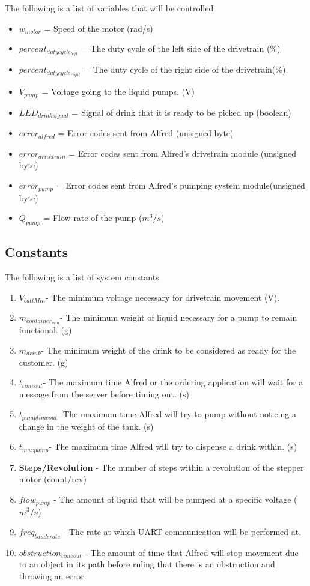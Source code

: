 \documentclass [10pt]{article}
\begin{document}
The following is a list of variables that will be controlled
\begin{itemize}
	\item $w_{motor}$ = Speed of the motor (rad/s)
	\item $percent_{dutycycle_{left}}$ = The duty cycle of the left side of the drivetrain (\%)
	\item $percent_{dutycycle_{right}}$ = The duty cycle of the right side of the drivetrain(\%)
	\item $V_{pump}$ = Voltage going to the liquid pumps. (V)
	\item $LED_{drinksignal}$ = Signal of drink that it is ready to be picked up (boolean)
	\item $error_{alfred}$ = Error codes sent from Alfred (unsigned byte)
	\item $error_{drivetrain}$ = Error codes sent from Alfred’s drivetrain module (unsigned byte)
	\item $error_{pump}$ = Error codes sent from Alfred’s pumping system module(unsigned byte)
	\item $Q_{pump}$ = Flow rate of the pump ($m^3/s$)
\end{itemize}

\subsection{Constants}

The following is a list of system constants
\begin{enumerate}
	\item \textbf{$ V_{battMin} $}- The minimum voltage necessary for drivetrain movement (V).
	\item \textbf{$ m_{container_{min}} $}- The minimum weight of liquid necessary for a pump to remain functional. (g)
	\item \textbf{$ m_{drink} $}- The minimum weight of the drink to be considered as ready for the customer. (g)
	\item \textbf{$ t_{timeout} $}- The maximum time Alfred or the ordering application will wait for a message from the server before timing out. (s)
	\item \textbf{$ t_{pumptimeout} $}- The maximum time Alfred will try to pump without noticing a change in the weight of the tank. (s)
	\item \textbf{$ t_{maxpump} $}- The maximum time Alfred will try to dispense a drink within. (s)
	\item \textbf{Steps/Revolution} -  The number of steps within a revolution of the stepper motor (count/rev)
	\item \textbf{$ flow_{pump} $} - The amount of liquid that will be pumped at a specific voltage ($ m^3/s $)
	\item \textbf{$ freq_{bauderate} $} - The  rate at which UART communication will be performed at.
	\item \textbf{$ obstruction_{timeout} $} - The amount of time that Alfred will stop movement due to an object in its path before ruling that there is an obstruction and throwing an error.
\end{enumerate}
\end{document}
